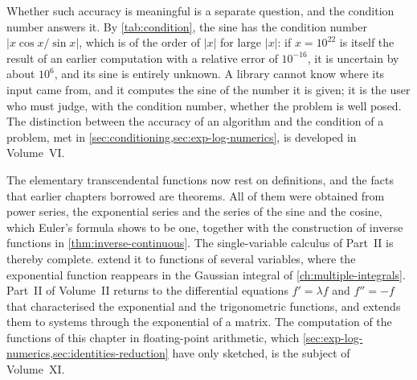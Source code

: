 Whether such accuracy is meaningful is a separate question, and the condition number answers it. By \cref{tab:condition}, the sine has the condition number $|x\cos x/\sin x|$, which is of the order of $|x|$ for large $|x|$: if $x=10^{22}$ is itself the result of an earlier computation with a relative error of $10^{-16}$, it is uncertain by about $10^6$, and its sine is entirely unknown. A library cannot know where its input came from, and it computes the sine of the number it is given; it is the user who must judge, with the condition number, whether the problem is well posed. The distinction between the accuracy of an algorithm and the condition of a problem, met in \cref{sec:conditioning,sec:exp-log-numerics}, is developed in Volume~VI.

\bigskip
The elementary transcendental functions now rest on definitions, and the facts that earlier chapters borrowed are theorems. All of them were obtained from power series, the exponential series and the series of the sine and the cosine, which Euler's formula shows to be one, together with the construction of inverse functions in \cref{thm:inverse-continuous}. The single-variable calculus of Part~II is thereby complete.  extend it to functions of several variables, where the exponential function reappears in the Gaussian integral of \cref{ch:multiple-integrals}. Part~II of Volume~II returns to the differential equations $f'=\lambda f$ and $f''=-f$ that characterised the exponential and the trigonometric functions, and extends them to systems through the exponential of a matrix. The computation of the functions of this chapter in floating-point arithmetic, which \cref{sec:exp-log-numerics,sec:identities-reduction} have only sketched, is the subject of Volume~XI.

\chapternotes

